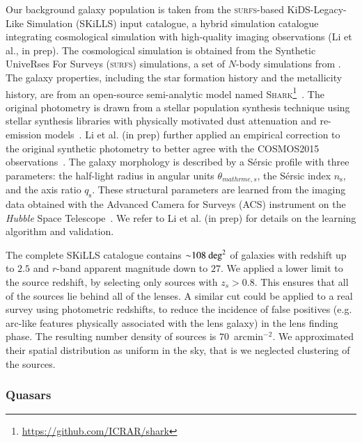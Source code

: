 \documentclass{aa}
\begin{document}
Our background galaxy population is taken from the \textsc{surfs}-based KiDS-Legacy-Like Simulation (SKiLLS) input catalogue, a hybrid simulation catalogue integrating cosmological simulation with high-quality imaging observations (Li et al., in prep). The cosmological simulation is obtained from the Synthetic UniveRses For Surveys (\textsc{surfs}) simulations, a set of $N$-body simulations from \citet{Ela++18}. The galaxy properties, including the star formation history and the metallicity history, are from an open-source semi-analytic model named \textsc{Shark}\footnote{\url{https://github.com/ICRAR/shark}}~\citep{Lag++18}. The original photometry is drawn from a stellar population synthesis technique using stellar synthesis libraries with physically motivated dust attenuation and re-emission models~\citep{Rob++20}. Li et al. (in prep) further applied an empirical correction to the original synthetic photometry to better agree with the COSMOS2015 observations~\citep{Lai++16}. The galaxy morphology is described by a S\'ersic profile with three parameters: the half-light radius in angular units $\theta_{
mathrm{e,s}}$, the S\'ersic index $n_\mathrm{s}$, and the axis ratio $q_\mathrm{s}$. These structural parameters are learned from the imaging data obtained with the Advanced Camera for Surveys (ACS) instrument on the \textit{Hubble} Space Telescope~\citep{Gri++12}. We refer to Li et al. (in prep) for details on the learning algorithm and validation.

The complete SKiLLS catalogue contains ${\sim}108~{\rm deg}^2$ of galaxies with redshift up to $2.5$ and $r$-band apparent magnitude down to $27$.
We applied a lower limit to the source redshift, by selecting only sources with $z_s > 0.8$.
This ensures that all of the sources lie behind all of the lenses.
A similar cut could be applied to a real survey using photometric redshifts, to reduce the incidence of false positives (e.g. arc-like features physically associated with the lens galaxy) in the lens finding phase.
The resulting number density of sources is $70$~arcmin$^{-2}$.
We approximated their spatial distribution as uniform in the sky, that is we neglected clustering of the sources.

\subsubsection{Quasars}\label{ssub:quasars}
\end{document}
